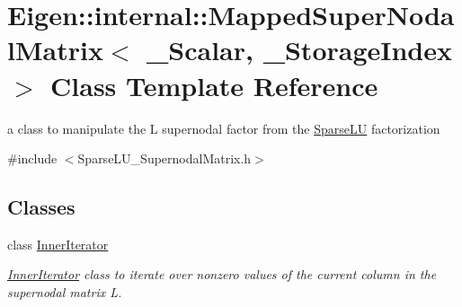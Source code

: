 \hypertarget{class_eigen_1_1internal_1_1_mapped_super_nodal_matrix}{}\section{Eigen\+::internal\+::Mapped\+Super\+Nodal\+Matrix$<$ \+\_\+\+Scalar, \+\_\+\+Storage\+Index $>$ Class Template Reference}
\label{class_eigen_1_1internal_1_1_mapped_super_nodal_matrix}


a class to manipulate the L supernodal factor from the \mbox{\hyperlink{class_eigen_1_1_sparse_l_u}{Sparse\+LU}} factorization  




{\ttfamily \#include $<$Sparse\+L\+U\+\_\+\+Supernodal\+Matrix.\+h$>$}

\subsection*{Classes}
\begin{DoxyCompactItemize}
\item 
class \mbox{\hyperlink{class_eigen_1_1internal_1_1_mapped_super_nodal_matrix_1_1_inner_iterator}{Inner\+Iterator}}
\begin{DoxyCompactList}\small\item\em \mbox{\hyperlink{class_eigen_1_1internal_1_1_mapped_super_nodal_matrix_1_1_inner_iterator}{Inner\+Iterator}} class to iterate over nonzero values of the current column in the supernodal matrix L. \end{DoxyCompactList}\end{DoxyCompactItemize}
